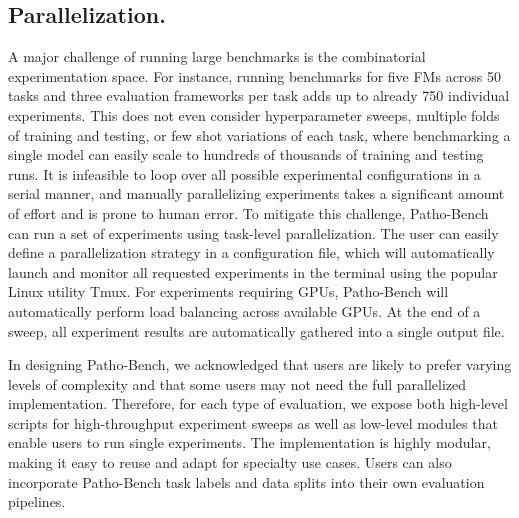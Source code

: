 \subsection{Parallelization.}
A major challenge of running large benchmarks is the combinatorial experimentation space. For instance, running benchmarks for five FMs across 50 tasks and three evaluation frameworks per task adds up to already 750 individual experiments. This does not even consider hyperparameter sweeps, multiple folds of training and testing, or few shot variations of each task, where benchmarking a single model can easily scale to hundreds of thousands of training and testing runs. It is infeasible to loop over all possible experimental configurations in a serial manner, and manually parallelizing experiments takes a significant amount of effort and is prone to human error. To mitigate this challenge, Patho-Bench can run a set of experiments using task-level parallelization. The user can easily define a parallelization strategy in a configuration file, which will automatically launch and monitor all requested experiments in the terminal using the popular Linux utility Tmux. For experiments requiring GPUs, Patho-Bench will automatically perform load balancing across available GPUs. At the end of a sweep, all experiment results are automatically gathered into a single output file.

In designing Patho-Bench, we acknowledged that users are likely to prefer varying levels of complexity and that some users may not need the full parallelized implementation. Therefore, for each type of evaluation, we expose both high-level scripts for high-throughput experiment sweeps as well as low-level modules that enable users to run single experiments. The implementation is highly modular, making it easy to reuse and adapt for specialty use cases. Users can also incorporate Patho-Bench task labels and data splits into their own evaluation pipelines.
